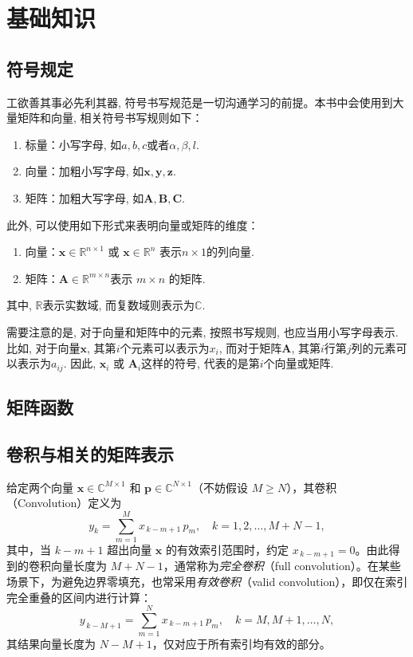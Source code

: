 \appendix
\chapter{基础知识}


\section{符号规定}

工欲善其事必先利其器, 符号书写规范是一切沟通学习的前提。本书中会使用到大量矩阵和向量, 相关符号书写规则如下：
\begin{enumerate}
    \item 标量：小写字母, 如$a,b,c$或者$\alpha, \beta, l$.
    \item 向量：加粗小写字母, 如$\bm{x},\bm{y},\bm{z}$.
    \item 矩阵：加粗大写字母, 如$\mathbf{A},\mathbf{B},\mathbf{C}$.
\end{enumerate}


此外, 可以使用如下形式来表明向量或矩阵的维度：
\begin{enumerate}
    \item 向量：$\bm{x} \in \mathbb{R}^{n \times 1}$ 或 $\bm{x} \in \mathbb{R}^{n}$ 表示\( n \times 1 \)的列向量.
    \item 矩阵：$\mathbf{A} \in \mathbb{R}^{m \times n}$表示 $m \times n$ 的矩阵.
\end{enumerate}
其中, $\mathbb{R}$表示实数域, 而复数域则表示为$\mathbb{C}$.

需要注意的是, 对于向量和矩阵中的元素, 按照书写规则, 也应当用小写字母表示. 比如, 对于向量$\bm{x}$, 其第$i$个元素可以表示为$x_i$, 而对于矩阵$\mathbf{A}$, 其第$i$行第$j$列的元素可以表示为$a_{ij}$. 因此, \( \bm{x}_i \) 或 \( \mathbf{A}_i \)这样的符号, 代表的是第\( i \)个向量或矩阵.

\section{矩阵函数}

\section{卷积与相关的矩阵表示}\label{apx.conv-corr-mat}

给定两个向量 \( \bm{x} \in \mathbb{C}^{M \times 1} \) 和 \( \bm{p} \in \mathbb{C}^{N \times 1} \)（不妨假设 \( M \geq N \)），其卷积（Convolution）定义为
\begin{equation}
    y_k = \sum_{m=1}^{M} x_{\,k-m+1}\, p_m,
    \quad k = 1,2,\ldots, M+N-1,
\end{equation}
其中，当 \(k-m+1\) 超出向量 \(\bm{x}\) 的有效索引范围时，约定 \(x_{\,k-m+1}=0\)。由此得到的卷积向量长度为 \(M+N-1\)，通常称为\emph{完全卷积}（full convolution）。在某些场景下，为避免边界零填充，也常采用\emph{有效卷积}（valid convolution），即仅在索引完全重叠的区间内进行计算：
\begin{equation}
    y_{\,k-M+1} = \sum_{m=1}^{N} x_{\,k-m+1}\, p_m,
    \quad k = M, M+1, \ldots, N,
\end{equation}
其结果向量长度为 \(N-M+1\)，仅对应于所有索引均有效的部分。

